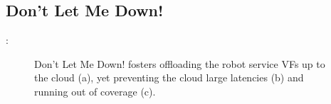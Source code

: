 \documentclass[aspectratio=169,dvipsnames]{beamer}
\begin{document}
\subsection{Don't Let Me Down!}
\begin{frame}{\secname: \subsecname}
    \begin{figure}[t]%
        \hfill
        \hfill
    
        \caption{Don't Let Me Down! fosters
        offloading the robot service VFs up to
        the cloud (a), yet preventing the cloud
        large latencies (b)
        and running out of coverage (c).}
        \label{fig:dlmd}%
    \end{figure}
\end{frame}

\end{document}

